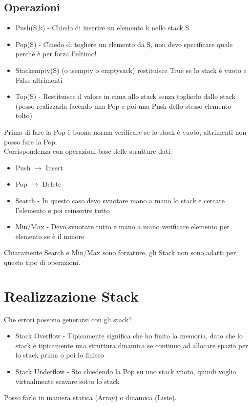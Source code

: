 \subsection{Operazioni}
\begin{itemize}
    \item Push(S,k) - Chiedo di inserire un elemento k nello stack S
    \item Pop(S) - Chiedo di togliere un elemento da S, non devo specificare quale perchè è per forza l'ultimo!
    \item Stackempty(S) (o isempty o emptysack) restituisce True se lo stack è vuoto e False altrimenti
    \item Top(S) - Restituisce il valore in cima allo stack senza toglierlo dallo stack (posso realizzarla facendo
    una Pop e poi una Push dello stesso elemento tolto)
\end{itemize}
Prima di fare la Pop è buona norma verificare se lo stack è vuoto, altrimenti non posso fare la Pop.\\
Corrispondenza con operazioni base delle strutture dati:
\begin{itemize}
    \item Push $\rightarrow$ Insert
    \item Pop $\rightarrow$ Delete
    \item Search - In questo caso devo svuotare mano a mano lo stack e cercare l'elemento e poi reinserire tutto
    \item Min/Max - Devo svuotare tutto e mano a mano verificare elemento per elemento se è il minore
\end{itemize}
Chiaramente Search e Min/Max sono forzature, gli Stack non sono adatti per questo tipo di operazioni.\\
\section{Realizzazione Stack}
Che errori possono generarsi con gli stack?
\begin{itemize}
    \item Stack Overflow - Tipicamente significa che ho finito la memoria, dato che lo stack è tipicamente
    una struttura dinamica se continuo ad allocare spazio per lo stack prima o poi lo finisco
    \item Stack Underflow - Sto chiedendo la Pop su uno stack vuoto, quindi voglio virtualmente scavare sotto
    lo stack
\end{itemize}
Posso farlo in maniera statica (Array) o dinamica (Liste).
